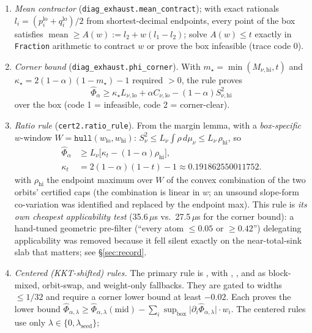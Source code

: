 \documentclass[11pt]{article}
\theoremstyle{plain}
\theoremstyle{definition}
\theoremstyle{remark}
\DeclareMathOperator{\mean}{mean}
\begin{document}
\begin{enumerate}
\item[\texttt{0}] \emph{Mean contractor} (\texttt{diag\_exhaust.mean\_contract});
with exact rationals $l_i=(p_i^{\mathrm{lo}}+q_i^{\mathrm{lo}})/2$ from
shortest-decimal endpoints, every point of the box satisfies
$\mean\ge A(w):=l_2+w(l_1-l_2)$; solve $A(w)\le t$ exactly in
\texttt{Fraction} arithmetic to contract $w$ or prove the box infeasible
(trace code 0).
\item[\texttt{1,2}] \emph{Corner bound} (\texttt{diag\_exhaust.phi\_corner}).
With $m_{\star}=\min(M_{\nu,\mathrm{hi}},t)$ and
$\kappa_{\star}=2(1-\alpha)(1-m_{\star})-1$ required $>0$, the rule proves
\[
\widehat\Phi_\alpha\ge
\kappa_{\star}L_{\nu,\mathrm{lo}}+\alpha C_{\nu,\mathrm{lo}}
-(1-\alpha)S_{\nu,\mathrm{hi}}^2
\]
over the box (code 1 = infeasible, code 2 = corner-clear).
\item[\texttt{3}] \emph{Ratio rule} (\texttt{cert2.ratio\_rule}). From the
margin lemma, with a \emph{box-specific} $w$-window
$W=\texttt{hull}(w_{\mathrm{lo}},w_{\mathrm{hi}})$:
$S_\nu^2\le L_\nu\int\rho\,d\mu_\nu\le L_\nu\,\rho_{\mathrm{hi}}$, so
\begin{align*}
\widehat\Phi_\alpha&\ge L_\nu\bigl[\kappa_t-(1-\alpha)\rho_{\mathrm{hi}}\bigr],\\
\kappa_t&=2(1-\alpha)(1-t)-1
\approx0.191862550011752.
\end{align*}
with $\rho_{\mathrm{hi}}$ the endpoint maximum over $W$ of the convex
combination of the two orbits' certified caps (the combination is linear in $w$;
an unsound slope-form co-variation was identified and replaced by the endpoint
max). This rule is \emph{its own cheapest applicability test} (35.6\,$\mu$s
vs.\ 27.5\,$\mu$s for the corner bound): a hand-tuned geometric pre-filter
(``every atom $\le0.05$ or $\ge0.42$'') delegating applicability was removed
because it fell silent exactly on the near-total-sink slab that matters; see
\S\ref{sec:record}.
\item[\texttt{4--7}] \emph{Centered (KKT-shifted) rules.}
The primary rule is , with
, , and
 as block-mixed, orbit-swap, and weight-only
fallbacks.  They are gated to widths
$\le1/32$ and require a corner lower bound at least $-0.02$.  Each proves
the lower bound
$\widehat\Phi_{\alpha,\lambda}\ge
\widehat\Phi_{\alpha,\lambda}(\mathrm{mid})-\sum_i
\sup_{\mathrm{box}}\lvert\partial_i\widehat\Phi_{\alpha,\lambda}\rvert\cdot w_i$.
The centered rules use only \(\lambda\in\{0,\lambda_{\mathrm{seed}}\}\);

\end{enumerate}
\end{document}
